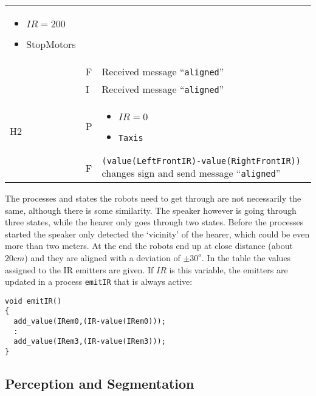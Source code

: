 \begin{longtable}{||p{.5cm}|p{.5cm}|p{8.5cm}||}
\begin{itemize}
\item $IR=200$
\item StopMotors
\end{itemize}\\\cline{2-3}
 & F & Received message ``\texttt{aligned}''\\\hline
\multirow{3}{1cm}{H2} & I  & Received message ``\texttt{aligned}''\\\cline{2-3}
 & P & \begin{itemize}
\item $IR=0$
\item \texttt{Taxis}
\end{itemize}\\\cline{2-3}
 & F & \texttt{(value(LeftFrontIR)-value(RightFrontIR))} changes sign and send message ``\texttt{aligned}''\\
\end{longtable}


\p
The processes and states the robots need to get through are not necessarily the same, although there is some similarity. The speaker however is going through three states, while the hearer only goes through two states. Before the processes started the speaker only detected the `vicinity' of the hearer, which could be even more than two meters. At the end the robots end up at close distance (about $20 cm$) and they are aligned with a deviation of $\pm 30^o$. In the table the values assigned to the IR emitters are given. If $IR$ is this variable, the emitters are updated in a process \texttt{emitIR} that is always active:

\p
\begin{verbatim}
void emitIR()
{
  add_value(IRem0,(IR-value(IRem0)));
  :
  add_value(IRem3,(IR-value(IRem3)));
}
\end{verbatim}

\subsection{Perception and Segmentation}



